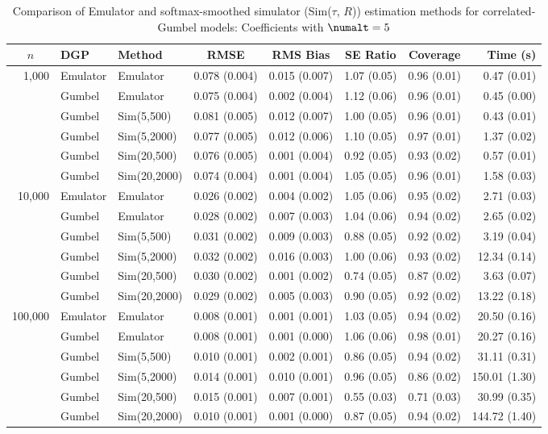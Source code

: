 \begin{table}[htbp]
\centering
\footnotesize
\begin{tabular}{@{}rllrrrrr@{}}
\toprule
\multicolumn{1}{c}{$n$} & \multicolumn{1}{l}{DGP} & \multicolumn{1}{l}{Method} & \multicolumn{1}{c}{RMSE} & \multicolumn{1}{c}{RMS Bias} & \multicolumn{1}{c}{SE Ratio} & \multicolumn{1}{c}{Coverage} & \multicolumn{1}{r}{Time (s)} \\
\midrule
\multirow{6}{*}{1,000} & Emulator & Emulator & 0.078 (0.004) & 0.015 (0.007) & 1.07 (0.05) & 0.96 (0.01) & 0.47 (0.01) \\
 & Gumbel & Emulator & 0.075 (0.004) & 0.002 (0.004) & 1.12 (0.06) & 0.96 (0.01) & 0.45 (0.00) \\
 & Gumbel & Sim(5,500) & 0.081 (0.005) & 0.012 (0.007) & 1.00 (0.05) & 0.96 (0.01) & 0.43 (0.01) \\
 & Gumbel & Sim(5,2000) & 0.077 (0.005) & 0.012 (0.006) & 1.10 (0.05) & 0.97 (0.01) & 1.37 (0.02) \\
 & Gumbel & Sim(20,500) & 0.076 (0.005) & 0.001 (0.004) & 0.92 (0.05) & 0.93 (0.02) & 0.57 (0.01) \\
 & Gumbel & Sim(20,2000) & 0.074 (0.004) & 0.001 (0.004) & 1.05 (0.05) & 0.96 (0.01) & 1.58 (0.03) \\
\midrule
\multirow{6}{*}{10,000} & Emulator & Emulator & 0.026 (0.002) & 0.004 (0.002) & 1.05 (0.06) & 0.95 (0.02) & 2.71 (0.03) \\
 & Gumbel & Emulator & 0.028 (0.002) & 0.007 (0.003) & 1.04 (0.06) & 0.94 (0.02) & 2.65 (0.02) \\
 & Gumbel & Sim(5,500) & 0.031 (0.002) & 0.009 (0.003) & 0.88 (0.05) & 0.92 (0.02) & 3.19 (0.04) \\
 & Gumbel & Sim(5,2000) & 0.032 (0.002) & 0.016 (0.003) & 1.00 (0.06) & 0.93 (0.02) & 12.34 (0.14) \\
 & Gumbel & Sim(20,500) & 0.030 (0.002) & 0.001 (0.002) & 0.74 (0.05) & 0.87 (0.02) & 3.63 (0.07) \\
 & Gumbel & Sim(20,2000) & 0.029 (0.002) & 0.005 (0.003) & 0.90 (0.05) & 0.92 (0.02) & 13.22 (0.18) \\
\midrule
\multirow{6}{*}{100,000} & Emulator & Emulator & 0.008 (0.001) & 0.001 (0.001) & 1.03 (0.05) & 0.94 (0.02) & 20.50 (0.16) \\
 & Gumbel & Emulator & 0.008 (0.001) & 0.001 (0.000) & 1.06 (0.06) & 0.98 (0.01) & 20.27 (0.16) \\
 & Gumbel & Sim(5,500) & 0.010 (0.001) & 0.002 (0.001) & 0.86 (0.05) & 0.94 (0.02) & 31.11 (0.31) \\
 & Gumbel & Sim(5,2000) & 0.014 (0.001) & 0.010 (0.001) & 0.96 (0.05) & 0.86 (0.02) & 150.01 (1.30) \\
 & Gumbel & Sim(20,500) & 0.015 (0.001) & 0.007 (0.001) & 0.55 (0.03) & 0.71 (0.03) & 30.99 (0.35) \\
 & Gumbel & Sim(20,2000) & 0.010 (0.001) & 0.001 (0.000) & 0.87 (0.05) & 0.94 (0.02) & 144.72 (1.40) \\
\bottomrule
\end{tabular}
\caption{Comparison of Emulator and softmax-smoothed simulator (Sim($\tau$, $R$)) estimation methods for correlated-Gumbel models: Coefficients with $\numalt=5$}
\label{tab:emulator_vs_sim_gumbel:5:beta}
\end{table}